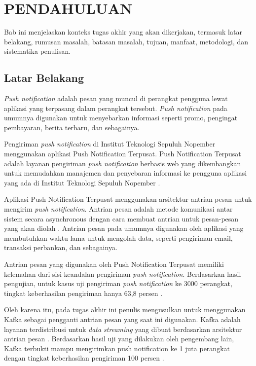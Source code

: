 \vspace{0ex}
\chapter {PENDAHULUAN}
\par Bab ini menjelaskan konteks tugas akhir yang akan dikerjakan, termasuk latar belakang, rumusan masalah, batasan masalah, tujuan, manfaat, metodologi, dan sistematika penulisan.

\section{Latar Belakang}
\par \textit{Push notification} adalah pesan yang muncul di perangkat pengguna lewat aplikasi yang terpasang dalam perangkat tersebut. \textit{Push notification} pada umumnya digunakan untuk menyebarkan informasi seperti promo, pengingat pembayaran, berita terbaru, dan sebagainya.
\par Pengiriman \textit{push notification} di Institut Teknologi Sepuluh Nopember menggunakan aplikasi Push Notification Terpusat. Push Notification Terpusat adalah layanan pengiriman \textit{push notification} berbasis web yang dikembangkan untuk memudahkan manajemen dan penyebaran informasi ke pengguna aplikasi yang ada di Institut Teknologi Sepuluh Nopember \cite{application-thesis}.
\par Aplikasi Push Notification Terpusat menggunakan arsitektur antrian pesan untuk mengirim \textit{push notification}. Antrian pesan adalah metode komunikasi antar sistem secara asynchronous dengan cara membuat antrian untuk pesan-pesan yang akan diolah \cite{message-queue-online}. Antrian pesan pada umumnya digunakan oleh aplikasi yang membutuhkan waktu lama untuk mengolah data, seperti pengiriman email, transaksi perbankan, dan sebagainya.
\par Antrian pesan yang digunakan oleh Push Notification Terpusat memiliki kelemahan dari sisi keandalan pengiriman \textit{push notification}. Berdasarkan hasil pengujian, untuk kasus uji pengiriman \textit{push notification} ke 3000 perangkat, tingkat keberhasilan pengiriman hanya 63,8 persen \cite{application-thesis}.
\par Oleh karena itu, pada tugas akhir ini penulis mengusulkan untuk menggunakan Kafka sebagai pengganti antrian pesan yang saat ini digunakan. Kafka adalah layanan terdistribusi untuk \textit{data streaming} yang dibuat berdasarkan arsitektur antrian pesan \cite{kafka-online}. Berdasarkan hasil uji yang dilakukan oleh pengembang lain, Kafka terbukti mampu mengirimkan push notification ke 1 juta perangkat dengan tingkat keberhasilan pengiriman 100 persen \cite{prototype-article}.

